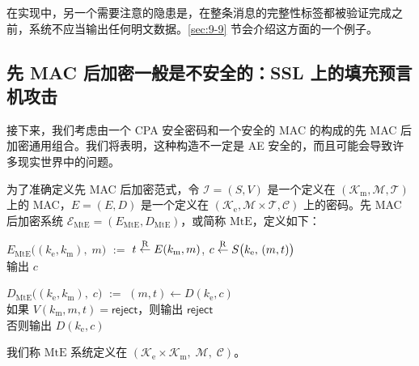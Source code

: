 在实现中，另一个需要注意的隐患是，在整条消息的完整性标签都被验证完成之前，系统不应当输出任何明文数据。\ref{sec:9-9} 节会介绍这方面的一个例子。

\subsection{先 MAC 后加密一般是不安全的：SSL 上的填充预言机攻击}\label{subsec:9-4-2}

接下来，我们考虑由一个 CPA 安全密码和一个安全的 MAC 的构成的先 MAC 后加密通用组合。我们将表明，这种构造不一定是 AE 安全的，而且可能会导致许多现实世界中的问题。

为了准确定义先 MAC 后加密范式，令 $\mathcal{I}=(S,V)$ 是一个定义在 $(\mathcal{K}_\mathrm{m},\mathcal{M},\mathcal{T})$ 上的 MAC，$E=(E,D)$ 是一个定义在 $(\mathcal{K}_\mathrm{e},\mathcal{M}\times\mathcal{T},\mathcal{C})$ 上的密码。先 MAC 后加密系统 $\mathcal{E}_\mathrm{MtE}=(E_\mathrm{MtE},D_\mathrm{MtE})$，或简称 $\mathrm{MtE}$，定义如下：

\vspace*{10pt}

\hspace*{20pt} $E_\mathrm{MtE}\big((k_\mathrm{e},k_\mathrm{m}),\;m\big)$
				\quad $:=$ \quad
				$t\overset{\rm R}\leftarrow E(k_\mathrm{m},m)$,
				\quad
				$c\overset{\rm R}\leftarrow S\big(k_\mathrm{e},\,(m,t)\big)$\\
\hspace*{165.5pt} 输出 $c$

\vspace*{5pt}

\hspace*{24pt} $D_\mathrm{MtE}\big((k_\mathrm{e},k_\mathrm{m}),\;c\big)$
				\quad $:=$ \quad
				$(m,t)\leftarrow D(k_\mathrm{e},c)$\\
\hspace*{165.5pt} 如果 $V(k_\mathrm{m},m,t)=\mathsf{reject}$，则输出 $\mathsf{reject}$\\
\hspace*{165.5pt} 否则输出 $D(k_\mathrm{e},c)$

\vspace*{10pt}

\noindent
我们称 $\mathrm{MtE}$ 系统定义在 $(\mathcal{K}_\mathrm{e}\times\mathcal{K}_\mathrm{m},\;\mathcal{M},\;\mathcal{C})$。

